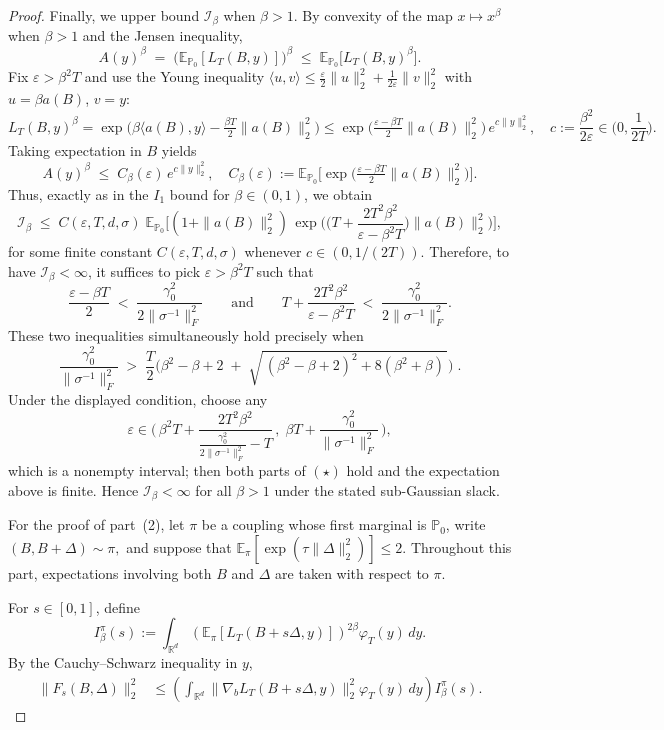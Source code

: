 \documentclass[11pt]{article}
\theoremstyle{definition}
\newcommand{\R}{\mathbb{R}}
\newcommand{\E}{\mathbb{E}}
\begin{document}
\begin{proof}
Finally, we upper bound $\mathcal I_\beta$ when $\beta > 1$.
By convexity of the map $x \mapsto x^{\beta}$ when $\beta > 1$ and the Jensen inequality, 
\[
A(y)^{\beta}\;=\;\big(\mathbb E_{\mathbb P_0}[L_T(B,y)]\big)^{\beta}\;\le\;\mathbb E_{\mathbb P_0}\!\big[L_T(B,y)^{\beta}\big].
\]
Fix \(\varepsilon>\beta^2 T\) and use the Young inequality
\(\langle u,v\rangle\le \tfrac{\varepsilon}{2}\|u\|_2^2+\tfrac{1}{2\varepsilon}\|v\|_2^2\) with \(u=\beta a(B)\), \(v=y\):
\[
L_T(B,y)^{\beta}
=\exp\!\Big(\beta\langle a(B),y\rangle-\tfrac{\beta T}{2}\|a(B)\|_2^2\Big)
\le \exp\!\Big(\tfrac{\varepsilon-\beta T}{2}\|a(B)\|_2^2\Big)\,e^{c\|y\|_2^2},
\quad c:=\frac{\beta^2}{2\varepsilon}\in\Big(0,\frac{1}{2T}\Big).
\]
Taking expectation in \(B\) yields
\[
A(y)^{\beta}\;\le\;C_{\beta}(\varepsilon)\,e^{c\|y\|_2^2},
\quad
C_{\beta}(\varepsilon):=
\mathbb E_{\mathbb P_0}\!\Big[\exp\!\Big(\tfrac{\varepsilon-\beta T}{2}\|a(B)\|_2^2\Big)\Big].
\]
Thus, exactly as in the \(I_1\) bound for \(\beta\in(0,1)\), we obtain 
\[
\mathcal I_\beta
\;\le\;C(\varepsilon,T,d,\sigma)\;
\mathbb E_{\mathbb P_0}\!\Big[(1+\|a(B)\|_2^2)\,
\exp\!\Big(\Big(T+\frac{2T^2\beta^2}{\varepsilon-\beta^2T}\Big)\|a(B)\|_2^2\Big)\Big],
\]
for some finite constant \(C(\varepsilon,T,d,\sigma)\) whenever \(c\in(0,1/(2T))\).
Therefore, to have \(\mathcal I_\beta<\infty\), it suffices to pick \(\varepsilon>\beta^2T\) such that
\[
\frac{\varepsilon-\beta T}{2}\;<\;\frac{\gamma_0^2}{2\|\sigma^{-1}\|_F^2}
\qquad\text{and}\qquad
T+\frac{2T^2\beta^2}{\varepsilon-\beta^2T}\;<\;\frac{\gamma_0^2}{2\|\sigma^{-1}\|_F^2}.
\tag{$\star$}
\]
These two inequalities simultaneously hold precisely when
\[
\frac{\gamma_0^2}{\|\sigma^{-1}\|_F^2}\;>\;\frac{T}{2}\Big(\beta^2-\beta+2
\;+\;\sqrt{\,(\beta^2-\beta+2)^{2}+8(\beta^2+\beta)\,}\Big)\;.
\]
Under the displayed condition, choose any
\[
\varepsilon\in\Big(\,\beta^2T+\frac{2T^2\beta^2}{\frac{\gamma_0^2}{2\|\sigma^{-1}\|_F^2}-T}\,,\;\beta T+\frac{\gamma_0^2}{\|\sigma^{-1}\|_F^2}\,\Big),
\]
which is a nonempty interval; then both parts of \((\star)\) hold and the expectation above is finite. Hence \(\mathcal I_\beta<\infty\) for all \(\beta>1\) under the stated sub-Gaussian slack.

For the proof of part~(2), let $\pi$ be a coupling whose first marginal
is $\mathbb P_0$, write $(B,B+\Delta)\sim\pi,$
and suppose that $\E_\pi
\left[
\exp\!\left(\tau\|\Delta\|_2^2\right)
\right]
\leq 2.$
Throughout this part, expectations involving both $B$ and $\Delta$ are
taken with respect to $\pi$.

For $s\in[0,1]$, define
\[
I_\beta^\pi(s)
:=
\int_{\R^d}
\left(
\E_\pi[L_T(B+s\Delta,y)]
\right)^{2\beta}
\varphi_T(y)\,dy.
\]
By the Cauchy--Schwarz inequality in $y$,
\begin{align}
\|F_s(B,\Delta)\|_2^2
&\leq
\left(
\int_{\R^d}
\|\nabla_bL_T(B+s\Delta,y)\|_2^2
\varphi_T(y)\,dy
\right)
I_\beta^\pi(s).
\label{eq:Fs-two-factors}
\end{align}


\end{proof}
\end{document}
